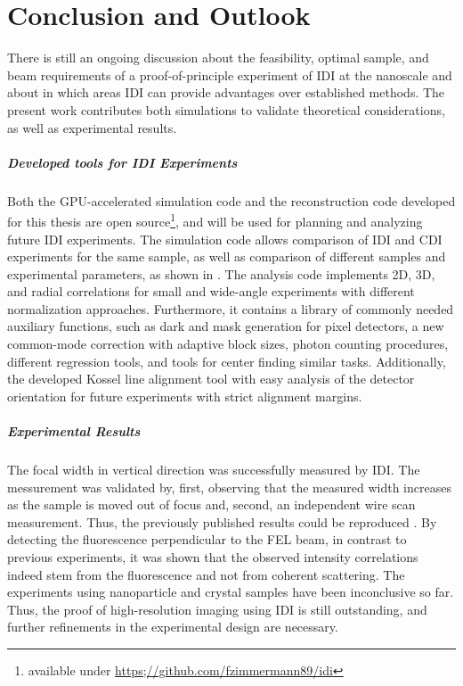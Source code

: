 \chapter{Conclusion and Outlook}
There is still an ongoing discussion about the feasibility, optimal sample, and beam requirements of a proof-of-principle experiment of IDI at the nanoscale and about in which areas IDI can provide advantages over established methods. The present work contributes both simulations to validate theoretical considerations, as well as experimental results.

\paragraph{Developed tools for IDI Experiments}
Both the GPU-accelerated simulation code and the reconstruction code developed for this thesis are open source\footnote{available under \url{https;//github.com/fzimmermann89/idi}}, and will be used for planning and analyzing future IDI experiments. The simulation code allows comparison of IDI and CDI experiments for the same sample, as well as comparison of different samples and experimental parameters, as shown in .
The analysis code implements 2D, 3D, and radial correlations for small and wide-angle experiments with different normalization approaches. Furthermore, it contains a library of commonly needed auxiliary functions, such as dark and mask generation for pixel detectors, a new common-mode correction with adaptive block sizes, photon counting procedures, different regression tools, and tools for center finding similar tasks.
Additionally, the developed Kossel line alignment tool with easy analysis of the detector orientation for future experiments with strict alignment margins.

\paragraph{Experimental Results}
The focal width in vertical direction was successfully measured by IDI. The messurement was validated by, first, observing that the measured width increases as the sample is moved out of focus and, second, an independent wire scan measurement. Thus, the previously published results could be reproduced \cite{nakumura2020}. By detecting the fluorescence perpendicular to the FEL beam, in contrast to previous experiments, it was shown that the observed intensity correlations indeed stem from the fluorescence and not from coherent scattering. 
The experiments using nanoparticle and crystal samples have been inconclusive so far. Thus, the proof of high-resolution imaging using IDI is still outstanding, and further refinements in the experimental design are necessary.


